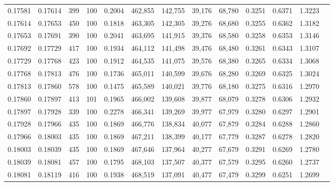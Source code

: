 \begin{tabular}{rrrrrrrrrrrrr}
0.17581 & 0.17614 &   399 & 100 &                                     0.2004 & 462,855 & 142,755 &  39,176 &  68,780 & 0.3251 & 0.6371 & 1.3223 \\
0.17614 & 0.17653 &   450 & 100 &                                     0.1818 & 463,305 & 142,305 &  39,276 &  68,680 & 0.3255 & 0.6362 & 1.3182 \\
0.17653 & 0.17691 &   390 & 100 &                                     0.2041 & 463,695 & 141,915 &  39,376 &  68,580 & 0.3258 & 0.6353 & 1.3146 \\
0.17692 & 0.17729 &   417 & 100 &                                     0.1934 & 464,112 & 141,498 &  39,476 &  68,480 & 0.3261 & 0.6343 & 1.3107 \\
0.17729 & 0.17768 &   423 & 100 &                                     0.1912 & 464,535 & 141,075 &  39,576 &  68,380 & 0.3265 & 0.6334 & 1.3068 \\
0.17768 & 0.17813 &   476 & 100 &                                     0.1736 & 465,011 & 140,599 &  39,676 &  68,280 & 0.3269 & 0.6325 & 1.3024 \\
0.17813 & 0.17860 &   578 & 100 &                                     0.1475 & 465,589 & 140,021 &  39,776 &  68,180 & 0.3275 & 0.6316 & 1.2970 \\
0.17860 & 0.17897 &   413 & 101 &                                     0.1965 & 466,002 & 139,608 &  39,877 &  68,079 & 0.3278 & 0.6306 & 1.2932 \\
0.17897 & 0.17928 &   339 & 100 &                                     0.2278 & 466,341 & 139,269 &  39,977 &  67,979 & 0.3280 & 0.6297 & 1.2901 \\
0.17928 & 0.17966 &   435 & 100 &                                     0.1869 & 466,776 & 138,834 &  40,077 &  67,879 & 0.3284 & 0.6288 & 1.2860 \\
0.17966 & 0.18003 &   435 & 100 &                                     0.1869 & 467,211 & 138,399 &  40,177 &  67,779 & 0.3287 & 0.6278 & 1.2820 \\
0.18003 & 0.18039 &   435 & 100 &                                     0.1869 & 467,646 & 137,964 &  40,277 &  67,679 & 0.3291 & 0.6269 & 1.2780 \\
0.18039 & 0.18081 &   457 & 100 &                                     0.1795 & 468,103 & 137,507 &  40,377 &  67,579 & 0.3295 & 0.6260 & 1.2737 \\
0.18081 & 0.18119 &   416 & 100 &                                     0.1938 & 468,519 & 137,091 &  40,477 &  67,479 & 0.3299 & 0.6251 & 1.2699 \\

\end{tabular}
